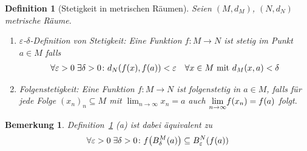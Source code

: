 \documentclass[11pt, twoside, a4paper]{article}
\theoremstyle{plain}
\newtheorem{bemerkung}[blockelement]{Bemerkung}
\newtheorem{definition}[blockelement]{Definition}
\numberwithin{equation}{subsection}
\newcommand{\pair}[1]{\left(#1\right)}
\newcommand{\of}[1]{\mathopen{}\mathclose{}\bgroup\left(#1\aftergroup\egroup\right)}
\newcommand{\fromto}{\rightarrow{}}
\newcommand{\ntoinf}[0]{n\fromto\infty}
\newcommand{\ex}{\;\exists}
\newcommand{\biglim}[1]{{\displaystyle \lim_{#1}}}
\begin{document}
    \begin{definition}[Stetigkeit in metrischen Räumen]
        \marginnote{[21. Jun]}
        \label{definition:stetigkeit-metr}
        Seien $\pair{M, d_M}$, $\pair{N, d_N}$ metrische Räume.
        \begin{enumerate}[label=(\alph*)]
            \item $\varepsilon$-$\delta$-Definition von Stetigkeit: Eine Funktion $f: M\fromto N$ ist stetig im Punkt $a\in M$ falls
            \begin{align*}
                \forall\varepsilon > 0\ex\delta > 0\colon d_N\of{f\of{x}, f\of{a}} < \varepsilon\quad\forall x\in M \text{ mit } d_M\of{x,a} < \delta
            \end{align*}
            \item Folgenstetigkeit: Eine Funktion $f: M\fromto N$ ist folgenstetig in $a\in M$, falls für jede Folge $(x_n)_n \subseteq M$ mit $\biglim{\ntoinf} x_n = a$ auch $\biglim{\ntoinf} f\of{x_n} = f\of{a}$ folgt.
        \end{enumerate}
    \end{definition}

    \begin{bemerkung}
        Definition~\ref{definition:stetigkeit-metr} (a) ist dabei äquivalent zu
        \begin{align*}
            \forall \varepsilon > 0\ex \delta > 0\colon f\of{B_{\delta}^M\of{a}} \subseteq B_{\varepsilon}^{N}\of{f\of{a}}
        \end{align*}
    \end{bemerkung}
\end{document}
